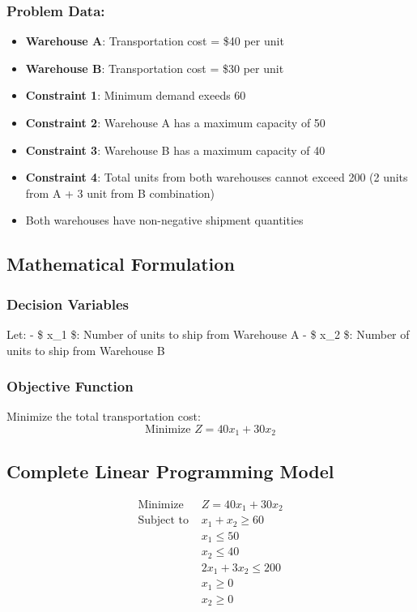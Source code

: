 \documentclass[
  letterpaper,
  DIV=11,
  numbers=noendperiod]{scrreprt}
\providecommand{\tightlist}{%
  \setlength{\itemsep}{0pt}\setlength{\parskip}{0pt}}
\begin{document}
\subsubsection{Problem Data:}\label{problem-data}

\begin{itemize}
\tightlist
\item
  \textbf{Warehouse A}: Transportation cost = \$40 per unit
\item
  \textbf{Warehouse B}: Transportation cost = \$30 per unit
\item
  \textbf{Constraint 1}: Minimum demand exeeds 60
\item
  \textbf{Constraint 2}: Warehouse A has a maximum capacity of 50
\item
  \textbf{Constraint 3}: Warehouse B has a maximum capacity of 40
\item
  \textbf{Constraint 4}: Total units from both warehouses cannot exceed
  200 (2 units from A + 3 unit from B combination)
\item
  Both warehouses have non-negative shipment quantities
\end{itemize}

\subsection{Mathematical Formulation}\label{mathematical-formulation}

\subsubsection{Decision Variables}\label{decision-variables-1}

Let: - \$ x\_1 \$: Number of units to ship from Warehouse A - \$ x\_2
\$: Number of units to ship from Warehouse B

\subsubsection{Objective Function}\label{objective-function-1}

Minimize the total transportation cost: \[
\text{Minimize } Z = 40x_1 + 30x_2
\]

\subsection{Complete Linear Programming
Model}\label{complete-linear-programming-model}

\[
\begin{aligned}
\text{Minimize } & Z = 40x_1 + 30x_2 \\
\text{Subject to } & x_1+x_2\geq 60\\
&x_1\leq 50\\
&x_2\leq 40\\
&2x_1 + 3x_2 \leq 200 \\
& x_1 \geq 0 \\
& x_2 \geq 0
\end{aligned}
\]
\end{document}
